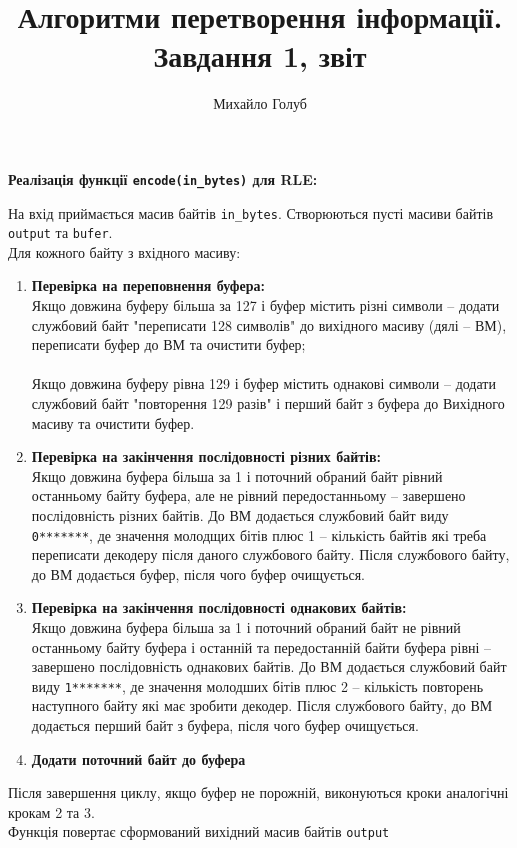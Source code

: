 \documentclass{article}
\title{Алгоритми перетворення інформації. Завдання 1, звіт}
\author{Михайло Голуб}
\def\code#1{\texttt{#1}}
\begin{document}
\maketitle
\newpage

\textbf{Реалізація функції \code{encode(in\_bytes)} для RLE:}
\\\indent

На вхід приймається масив байтів \code{in\_bytes}. Створюються пусті масиви байтів \code{output} та \code{bufer}.\\\indent 
Для кожного байту з вхідного масиву:
\begin{enumerate}
\item \textbf{Перевірка на переповнення буфера:}\\
Якщо довжина буферу більша за 127 і буфер містить різні символи -- додати службовий байт "переписати 128 символів" до вихідного масиву (дялі -- ВМ), переписати буфер до ВМ та очистити буфер;\\\\
Якщо довжина буферу рівна 129 і буфер містить однакові символи -- додати службовий байт "повторення 129 разів" і перший байт з буфера до Вихідного масиву та очистити буфер.
\item \textbf{Перевірка на закінчення послідовності різних байтів:}\\
Якщо довжина буфера більша за 1 і поточний обраний байт рівний останньому байту буфера, але не рівний передостанньому -- завершено послідовність різних байтів. До ВМ додається службовий байт виду \code{0*******}, де значення молодщих бітів плюс 1 -- кількість байтів які треба переписати декодеру після даного службового байту. Після службового байту, до ВМ додається буфер, після чого буфер очищується.
\item \textbf{Перевірка на закінчення послідовності однакових байтів:}\\
Якщо довжина буфера більша за 1 і поточний обраний байт не рівний останньому байту буфера і останній та передостанній байти буфера рівні -- завершено послідовність однакових байтів. До ВМ додається службовий байт виду \code{1*******}, де значення молодших бітів плюс 2 -- кількість повторень наступного байту які має зробити декодер. Після службового байту, до ВМ додається перший байт з буфера, після чого буфер очищується.
\item \textbf{Додати поточний байт до буфера}
\end{enumerate}

Після завершення циклу, якщо буфер не порожній, виконуються кроки аналогічні крокам 2 та 3.\\\indent
Функція повертає сформований вихідний масив байтів \code{output}\\\indent
\newpage
\end{document}

